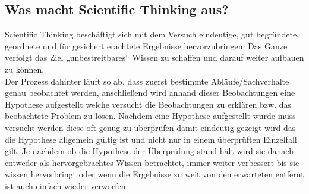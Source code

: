
\subsection{Was macht Scientific Thinking aus?}
Scientific Thinking beschäftigt sich mit dem Versuch eindeutige, gut begründete, geordnete und für gesichert erachtete Ergebnisse hervorzubringen. Das Ganze verfolgt das Ziel „unbestreitbares“ Wissen zu schaffen und darauf weiter aufbauen zu können. \\
Der Prozess dahinter läuft so ab, dass zuerst bestimmte Abläufe/Sachverhalte genau beobachtet werden, anschließend wird anhand dieser Beobachtungen eine Hypothese aufgestellt welche versucht die Beobachtungen zu erklären bzw. das beobachtete Problem zu lösen. Nachdem eine Hypothese aufgestellt wurde muss versucht werden diese oft genug zu überprüfen damit eindeutig gezeigt wird das die Hypothese allgemein gültig ist und nicht nur in einem überprüften Einzelfall gilt. Je nachdem ob die Hypothese der Überprüfung stand hält wird sie danach entweder als hervorgebrachtes Wissen betrachtet, immer weiter verbessert bis sie wissen hervorbringt oder wenn die Ergebnisse zu weit von den erwarteten entfernt ist auch einfach wieder verworfen.


